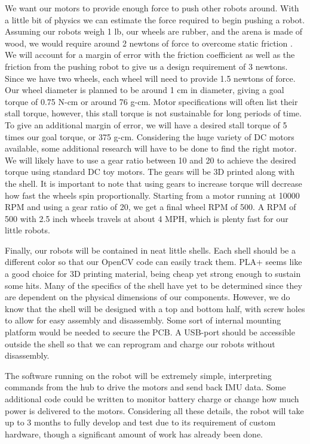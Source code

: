 \documentclass[11pt]{ieeeconf}
\begin{document}
We want our motors to provide enough force to push other robots around. With a little bit of physics we can estimate the force required to begin pushing a robot. Assuming our robots weigh 1 lb, our wheels are rubber, and the arena is made of wood, we would require around 2 newtons of force to overcome static friction \cite{physics}. We will account for a margin of error with the friction coefficient as well as the friction from the pushing robot to give us a design requirement of 3 newtons. Since we have two wheels, each wheel will need to provide 1.5 newtons of force. Our wheel diameter is planned to be around 1 cm in diameter, giving a goal torque of 0.75 N-cm or around 76 g-cm. Motor specifications will often list their stall torque, however, this stall torque is not sustainable for long periods of time. To give an additional margin of error, we will have a desired stall torque of 5 times our goal torque, or 375 g-cm. Considering the huge variety of DC motors available, some additional research will have to be done to find the right motor. We will likely have to use a gear ratio between 10 and 20 to achieve the desired torque using standard DC toy motors. The gears will be 3D printed along with the shell. It is important to note that using gears to increase torque will decrease how fast the wheels spin proportionally. Starting from a motor running at 10000 RPM and using a gear ratio of 20, we get a final wheel RPM of 500. A RPM of 500 with 2.5 inch wheels travels at about 4 MPH, which is plenty fast for our little robots.

Finally, our robots will be contained in neat little shells. Each shell should be a different color so that our OpenCV code can easily track them. PLA+ seems like a good choice for 3D printing material, being cheap yet strong enough to sustain some hits. Many of the specifics of the shell have yet to be determined since they are dependent on the physical dimensions of our components. However, we do know that the shell will be designed with a top and bottom half, with screw holes to allow for easy assembly and disassembly. Some sort of internal mounting platform would be needed to secure the PCB. A USB-port should be accessible outside the shell so that we can reprogram and charge our robots without disassembly. 

The software running on the robot will be extremely simple, interpreting commands from the hub to drive the motors and send back IMU data. Some additional code could be written to monitor battery charge or change how much power is delivered to the motors. Considering all these details, the robot will take up to 3 months to fully develop and test due to its requirement of custom hardware, though a significant amount of work has already been done.
\end{document}
